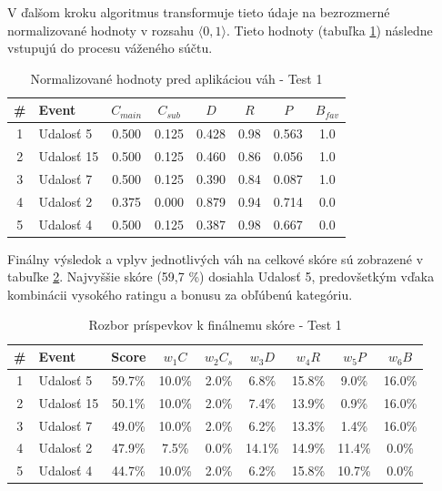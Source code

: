 \documentclass[12pt,a4paper]{article}
\begin{document}
V ďalšom kroku algoritmus transformuje tieto údaje na bezrozmerné normalizované hodnoty v rozsahu $\langle 0, 1 \rangle$. Tieto hodnoty (tabuľka \ref{tab:norm_test1}) následne vstupujú do procesu váženého súčtu.

\begin{table}[H]
\centering
\small
\begin{tabular}{|c|l|c|c|c|c|c|c|}
\hline
\textbf{\#} & \textbf{Event} & $C_{main}$ & $C_{sub}$ & $D$ & $R$ & $P$ & $B_{fav}$ \\
\hline
1 & Udalosť 5 & 0.500 & 0.125 & 0.428 & 0.98 & 0.563 & 1.0 \\
2 & Udalosť 15 & 0.500 & 0.125 & 0.460 & 0.86 & 0.056 & 1.0 \\
3 & Udalosť 7 & 0.500 & 0.125 & 0.390 & 0.84 & 0.087 & 1.0 \\
4 & Udalosť 2 & 0.375 & 0.000 & 0.879 & 0.94 & 0.714 & 0.0 \\
5 & Udalosť 4 & 0.500 & 0.125 & 0.387 & 0.98 & 0.667 & 0.0 \\
\hline
\end{tabular}
\caption{Normalizované hodnoty pred aplikáciou váh - Test 1}
\label{tab:norm_test1}
\end{table}

Finálny výsledok a vplyv jednotlivých váh na celkové skóre sú zobrazené v tabuľke \ref{tab:vysledky_test1}. Najvyššie skóre (59,7 \%) dosiahla Udalosť 5, predovšetkým vďaka kombinácii vysokého ratingu a bonusu za obľúbenú kategóriu.

\begin{table}[H]
\centering
\small
\begin{tabular}{|c|l|c|c|c|c|c|c|c|}
\hline
\textbf{\#} & \textbf{Event} & \textbf{Score} & $w_1 C$ & $w_2 C_s$ & $w_3 D$ & $w_4 R$ & $w_5 P$ & $w_6 B$ \\
\hline
1 & Udalosť 5  & 59.7\% & 10.0\% & 2.0\% & 6.8\%  & 15.8\% & 9.0\%  & 16.0\% \\
2 & Udalosť 15 & 50.1\% & 10.0\% & 2.0\% & 7.4\%  & 13.9\% & 0.9\%  & 16.0\% \\
3 & Udalosť 7  & 49.0\% & 10.0\% & 2.0\% & 6.2\%  & 13.3\% & 1.4\%  & 16.0\% \\
4 & Udalosť 2  & 47.9\% & 7.5\%  & 0.0\% & 14.1\% & 14.9\% & 11.4\% & 0.0\% \\
5 & Udalosť 4  & 44.7\% & 10.0\% & 2.0\% & 6.2\%  & 15.8\% & 10.7\% & 0.0\% \\
\hline
\end{tabular}
\caption{Rozbor príspevkov k finálnemu skóre - Test 1}
\label{tab:vysledky_test1}
\end{table}
\end{document}
